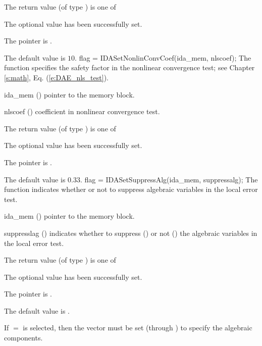 {
  The return value  (of type ) is one of
  \begin{args}
  \item[\Id{IDA\_SUCCESS}] 
    The optional value has been successfully set.
  \item[\Id{IDA\_MEM\_NULL}]
    The  pointer is .
  \end{args}
}
{
  The default value is $10$.
}
{
flag = IDASetNonlinConvCoef(ida\_mem, nlscoef);
}
{
  The function  specifies the safety factor
  in the nonlinear convergence test;
  see Chapter \ref{s:math}, Eq. (\ref{e:DAE_nls_test}).
}
{
  \begin{args}
  \item[ida\_mem] ()
    pointer to the {\ida} memory block.
  \item[nlscoef] ()
    coefficient in nonlinear convergence test.
  \end{args}
}
{
  The return value  (of type ) is one of
  \begin{args}
  \item[\Id{IDA\_SUCCESS}] 
    The optional value has been successfully set.
  \item[\Id{IDA\_MEM\_NULL}]
    The  pointer is .
  \end{args}
}
{
  The default value is $0.33$.
}
{
flag = IDASetSuppressAlg(ida\_mem, suppressalg);
}
{
  The function  indicates whether or not to
  suppress algebraic variables in the local error test.
}
{
  \begin{args}[suppressalg]
  \item[ida\_mem] ()
    pointer to the {\ida} memory block.
  \item[suppresslag] ()
    indicates whether to suppress () or not
    () the algebraic variables in the local error test.
  \end{args}
}
{
  The return value  (of type ) is one of
  \begin{args}
  \item[\Id{IDA\_SUCCESS}] 
    The optional value has been successfully set.
  \item[\Id{IDA\_MEM\_NULL}]
    The  pointer is .
  \end{args}
}
{
  The default value is .

  If $=$ is selected, then the  vector
  must be set (through ) to specify the algebraic components.
}
